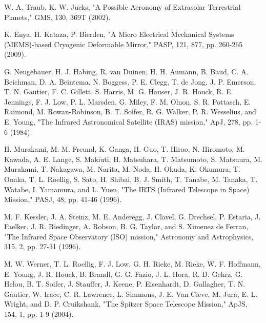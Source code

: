 \documentclass[a4paper]{article}
\begin{document}
\begin{thebibliography}{99}

W. A. Traub, K. W. Jucks, "A Possible Aeronomy of Extrasolar Terrestrial Planets," GMS, 130, 369T (2002).

K. Enya, H. Kataza, P. Bierden, "A Micro Electrical Mechanical Systems (MEMS)-based Cryogenic Deformable Mirror," PASP, 121, 877, pp. 260-265 (2009).

G. Neugebauer, H. J. Habing, R. van Duinen, H. H. Aumann, B. Baud, C. A. Beichman, D. A. Beintema, N. Boggess, P. E. Clegg, T. de Jong, J. P. Emerson, T. N. Gautier, F. C. Gillett, S. Harris, M. G. Hauser, J. R. Houck, R. E. Jennings, F. J. Low, P. L. Marsden, G. Miley, F. M. Olnon, S. R. Pottasch, E. Raimond, M. Rowan-Robinson, B. T. Soifer, R. G. Walker, P. R. Wesselius, and E. Young, "The Infrared Astronomical Satellite (IRAS) mission," ApJ, 278, pp. 1-6 (1984).  %

H. Murakami, M. M. Freund, K. Ganga, H. Guo, T. Hirao, N. Hiromoto, M. Kawada, A. E. Lange, S. Makiuti, H. Matsuhara, T. Matsumoto, S. Matsuura, M. Murakami, T. Nakagawa, M. Narita, M. Noda, H. Okuda, K. Okumura, T. Onaka, T. L. Roellig, S. Sato, H. Shibai, B. J. Smith, T. Tanabe, M. Tanaka, T. Watabe, I. Yamamura, and L. Yuen, "The IRTS (Infrared Telescope in Space) Mission," PASJ, 48, pp. 41-46 (1996).   %

M. F. Kessler, J. A. Steinz, M. E. Anderegg, J. Clavel, G. Drechsel, P. Estaria, J. Faelker, J. R. Riedinger, A. Robson, B. G. Taylor, and S. Ximenez de Ferran, "The Infrared Space Observatory (ISO) mission," Astronomy and Astrophysics, 315, 2, pp. 27-31 (1996).  %

M. W. Werner, T. L. Roellig, F. J. Low, G. H. Rieke, M. Rieke, W. F. Hoffmann, E. Young, J. R. Houck, B. Brandl, G. G. Fazio, J. L. Hora, R. D. Gehrz, G. Helou, B. T. Soifer, J. Stauffer, J. Keene, P. Eisenhardt, D. Gallagher, T. N. Gautier, W. Irace, C. R. Lawrence,  L. Simmons, J. E. Van Cleve, M. Jura, E. L. Wright, and D. P. Cruikshank, "The Spitzer Space Telescope Mission," ApJS, 154, 1, pp. 1-9 (2004).   %


\end{thebibliography}
\end{document}
